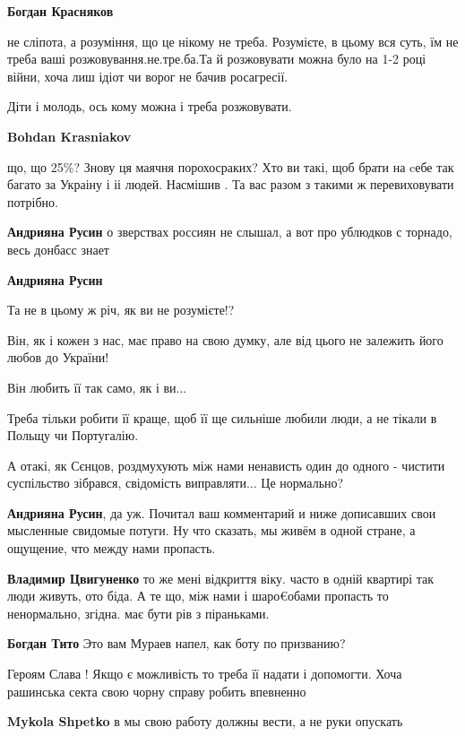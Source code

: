 \begin{itemize}
\begin{itemize}
\textbf{Богдан Красняков} 

не сліпота, а розуміння, що це нікому не треба. Розумієте, в цьому вся суть, їм
не треба ваші розжовування.не.тре.ба.Та й розжовувати можна було на 1-2 році
війни, хоча лиш ідіот чи ворог не бачив росагресії.

Діти і молодь, ось кому можна і треба розжовувати.

\textbf{Bohdan Krasniakov} 

що, що 25\%? Знову ця маячня порохосраких? Хто ви такі, щоб брати на cебе так
багато за Украіну і іі людей. Насмішив . Та вас разом з такими ж перевиховувати
потрібно.

\textbf{Андрияна Русин} о зверствах россиян не слышал, а вот про ублюдков с торнадо, весь донбасс знает

\textbf{Андрияна Русин} 

Та не в цьому ж річ, як ви не розумієте!?

Він, як і кожен з нас, має право на свою думку, але від цього не залежить його
любов до України!

Він любить її так само, як і ви...

Треба тільки робити її краще, щоб її ще сильніше любили люди, а не тікали в
Польщу чи Португалію.

А отакі, як Сєнцов, роздмухують між нами ненависть один до одного - чистити
суспільство зібрався, свідомість виправляти... Це нормально?


\textbf{Андрияна Русин}, да уж. Почитал ваш комментарий и ниже дописавших свои мысленные свидомые потуги. Ну что сказать, мы живём в одной стране, а ощущение, что между нами пропасть.

\textbf{Владимир Цвигуненко} то же мені відкриття віку. часто в одній квартирі так люди живуть, ото біда. А те що, між нами і шаро€обами пропасть то ненормально, згідна. має бути рів з піраньками.

\textbf{Богдан Тито} Это вам Мураев напел, как боту по призванию?
\end{itemize} %

Героям Слава !
Якщо є можливість то треба її надати і допомогти. Хоча рашинська секта свою чорну справу робить впевненно

\begin{itemize} %
\textbf{Mykola Shpetko} в мы свою работу должны вести, а не руки опускать


\end{itemize}
\end{itemize}
